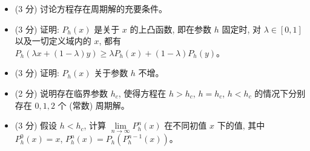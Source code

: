 \begin{enumerate}
    \begin{itemize}
        \item (3 分) 讨论方程存在周期解的充要条件。
        \item (3 分) 证明: $P_h(x)$ 是关于 $x$ 的上凸函数, 即在参数 $h$ 固定时, 对 $\lambda \in [0,1]$ 以及一切定义域内的 $x$, 
        都有 $P_h(\lambda x + (1-\lambda)y) \geqslant \lambda P_h(x) + (1-\lambda)P_h(y)$。
        \item (3 分) 证明: $P_h(x)$ 关于参数 $h$ 不增。
        \item (2 分) 说明存在临界参数 $h_c$, 使得方程在 $h > h_c$, $h = h_c$, $h < h_c$ 的情况下分别存在 $0,1,2$ 个 (常数) 周期解。
        \item (3 分) 假设 $h < h_c$, 计算 $\lim\limits_{n \to \infty} P_h^n(x)$ 在不同初值 $x$ 下的值, 其中 $P_h^0(x) = x$, $P_h^n(x) = P_h(P_h^{n-1}(x))$。
    \end{itemize}
\end{enumerate}


